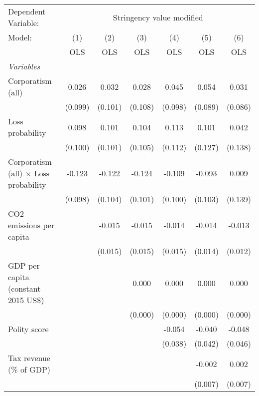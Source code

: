 
\begingroup
\centering
\begin{tabular}{lcccccc}
   \toprule
   Dependent Variable: & \multicolumn{6}{c}{Stringency value modified}\\
   Model:                                       & (1)     & (2)     & (3)     & (4)     & (5)     & (6)\\  
                                                &  OLS    & OLS     & OLS     & OLS     & OLS     & OLS\\  
   \midrule
   \emph{Variables}\\
   Corporatism (all)                            & 0.026   & 0.032   & 0.028   & 0.045   & 0.054   & 0.031\\   
                                                & (0.099) & (0.101) & (0.108) & (0.098) & (0.089) & (0.086)\\   
   Loss probability                             & 0.098   & 0.101   & 0.104   & 0.113   & 0.101   & 0.042\\   
                                                & (0.100) & (0.101) & (0.105) & (0.112) & (0.127) & (0.138)\\   
   Corporatism (all) $\times$ Loss probability  & -0.123  & -0.122  & -0.124  & -0.109  & -0.093  & 0.009\\   
                                                & (0.098) & (0.104) & (0.101) & (0.100) & (0.103) & (0.139)\\   
   CO2 emissions per capita                     &         & -0.015  & -0.015  & -0.014  & -0.014  & -0.013\\   
                                                &         & (0.015) & (0.015) & (0.015) & (0.014) & (0.012)\\   
   GDP per capita (constant 2015 US\$)          &         &         & 0.000   & 0.000   & 0.000   & 0.000\\   
                                                &         &         & (0.000) & (0.000) & (0.000) & (0.000)\\   
   Polity score                                 &         &         &         & -0.054  & -0.040  & -0.048\\   
                                                &         &         &         & (0.038) & (0.042) & (0.046)\\   
   Tax revenue (\% of GDP)                      &         &         &         &         & -0.002  & 0.002\\   
                                                &         &         &         &         & (0.007) & (0.007)\\   

\end{tabular}
